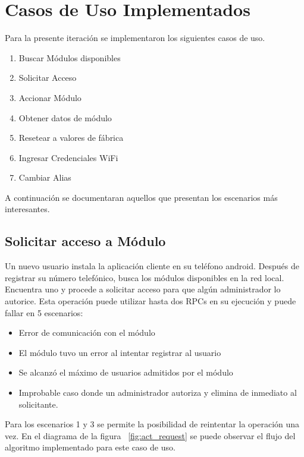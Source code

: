 \section{Casos de Uso Implementados}
Para la presente iteración se implementaron los siguientes casos de uso.
\begin{enumerate}
	\item Buscar Módulos disponibles
	\item Solicitar Acceso
	\item Accionar Módulo
	\item Obtener datos de módulo
	\item Resetear a valores de fábrica
	\item Ingresar Credenciales WiFi
	\item Cambiar Alias	
\end{enumerate}

A continuación se documentaran aquellos que presentan los escenarios más interesantes.

\subsection{Solicitar acceso a Módulo}
Un nuevo usuario instala la aplicación cliente en su teléfono android.
Después de registrar su número telefónico, busca los módulos disponibles en la red local.
Encuentra uno y procede a solicitar acceso para que algún administrador lo autorice.
Esta operación puede utilizar hasta dos RPCs en su ejecución y puede fallar en 5 escenarios:
\begin{itemize}
	\item Error de comunicación con el módulo
	\item El módulo tuvo un error al intentar registrar al usuario
	\item Se alcanzó el máximo de usuarios admitidos por el módulo
	\item Improbable caso donde un administrador autoriza y elimina de inmediato al solicitante.
\end{itemize}
Para los escenarios 1 y 3 se permite la posibilidad de reintentar la operación una vez.
En el diagrama de la figura ~\ref{fig:act_request} se puede observar el flujo del algoritmo implementado para este caso de uso.

